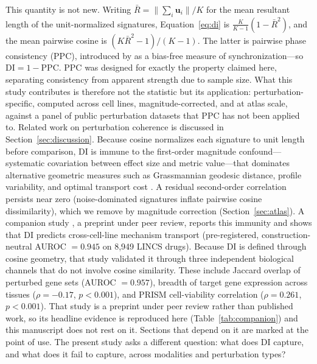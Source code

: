 \documentclass[11pt]{article}
\begin{document}
This quantity is not new.  Writing $\bar{R} = \|\sum_i \mathbf{u}_i\|/K$ for
the mean resultant length of the unit-normalized signatures,
Equation~\ref{eq:di} is $\frac{K}{K-1}(1 - \bar{R}^2)$, and the mean pairwise
cosine is $(K\bar{R}^2 - 1)/(K-1)$.  The latter is pairwise phase consistency
(PPC), introduced by \citet{vinck2010ppc} as a bias-free measure of
synchronization---so $\mathrm{DI} = 1 - \mathrm{PPC}$.  PPC was designed for
exactly the property claimed here, separating consistency from apparent
strength due to sample size.  What this study contributes is therefore not the
statistic but its application: perturbation-specific, computed across cell
lines, magnitude-corrected, and at atlas scale, against a panel of public
perturbation datasets that PPC has not been applied to.  Related work on
perturbation coherence is discussed in Section~\ref{sec:discussion}.  Because cosine normalizes each signature to unit
length before comparison, DI is immune to the first-order magnitude
confound---systematic covariation between effect size and metric
value---that dominates alternative geometric measures such as
Grassmannian geodesic distance, profile variability, and optimal
transport cost \citep{tower2026confound}.  A residual second-order
correlation persists near zero (noise-dominated signatures inflate
pairwise cosine dissimilarity), which we remove by magnitude correction
(Section~\ref{sec:atlas}).  A companion study \citep{tower2026confound}, a preprint under peer review,
reports this immunity and shows that DI predicts
cross-cell-line mechanism transport (pre-registered,
construction-neutral AUROC $= 0.945$ on 8{,}949 LINCS drugs).  Because DI is defined through cosine
geometry, that study validated it through three independent biological
channels that do not involve cosine similarity.  These include Jaccard
overlap of perturbed gene sets (AUROC $= 0.957$), breadth of target gene
expression across tissues ($\rho = -0.17$, $p < 0.001$), and PRISM
cell-viability correlation ($\rho = 0.261$, $p < 0.001$).  That study is a preprint under
peer review rather than published work, so its headline evidence is reproduced
here (Table~\ref{tab:companion}) and this manuscript does not rest on it.  Sections that depend on it are
marked at the point of use.  The present study asks a different question: what does DI capture, and what does it fail to capture, across
modalities and perturbation types?
\end{document}
